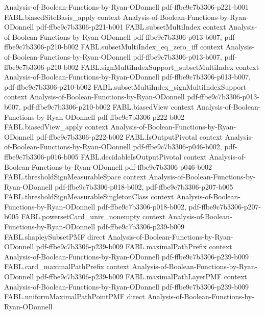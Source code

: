 \begin{theorem}
  {Analysis-of-Boolean-Functions-by-Ryan-ODonnell}
  {pdf-ffbe9c7b3306-p221-b001}
\proofstep
  {FABL.biasedSiteBasis_apply}
  {context}
  {Analysis-of-Boolean-Functions-by-Ryan-ODonnell}
  {pdf-ffbe9c7b3306-p221-b001}
\proofstep
  {FABL.subsetMultiIndex}
  {context}
  {Analysis-of-Boolean-Functions-by-Ryan-ODonnell}
  {pdf-ffbe9c7b3306-p013-b007,
    pdf-ffbe9c7b3306-p210-b002}
\proofstep
  {FABL.subsetMultiIndex_eq_zero_iff}
  {context}
  {Analysis-of-Boolean-Functions-by-Ryan-ODonnell}
  {pdf-ffbe9c7b3306-p013-b007,
    pdf-ffbe9c7b3306-p210-b002}
\proofstep
  {FABL.signMultiIndexSupport_subsetMultiIndex}
  {context}
  {Analysis-of-Boolean-Functions-by-Ryan-ODonnell}
  {pdf-ffbe9c7b3306-p013-b007,
    pdf-ffbe9c7b3306-p210-b002}
\proofstep
  {FABL.subsetMultiIndex_signMultiIndexSupport}
  {context}
  {Analysis-of-Boolean-Functions-by-Ryan-ODonnell}
  {pdf-ffbe9c7b3306-p013-b007,
    pdf-ffbe9c7b3306-p210-b002}
\proofstep
  {FABL.biasedView}
  {context}
  {Analysis-of-Boolean-Functions-by-Ryan-ODonnell}
  {pdf-ffbe9c7b3306-p222-b002}
\proofstep
  {FABL.biasedView_apply}
  {context}
  {Analysis-of-Boolean-Functions-by-Ryan-ODonnell}
  {pdf-ffbe9c7b3306-p222-b002}
\proofstep
  {FABL.IsOutputPivotal}
  {context}
  {Analysis-of-Boolean-Functions-by-Ryan-ODonnell}
  {pdf-ffbe9c7b3306-p046-b002,
    pdf-ffbe9c7b3306-p016-b005}
\proofstep
  {FABL.decidableIsOutputPivotal}
  {context}
  {Analysis-of-Boolean-Functions-by-Ryan-ODonnell}
  {pdf-ffbe9c7b3306-p046-b002}
\proofstep
  {FABL.thresholdSignMeasurableSpace}
  {context}
  {Analysis-of-Boolean-Functions-by-Ryan-ODonnell}
  {pdf-ffbe9c7b3306-p018-b002,
    pdf-ffbe9c7b3306-p207-b005}
\proofstep
  {FABL.thresholdSignMeasurableSingletonClass}
  {context}
  {Analysis-of-Boolean-Functions-by-Ryan-ODonnell}
  {pdf-ffbe9c7b3306-p018-b002,
    pdf-ffbe9c7b3306-p207-b005}
\proofstep
  {FABL.powersetCard_univ_nonempty}
  {context}
  {Analysis-of-Boolean-Functions-by-Ryan-ODonnell}
  {pdf-ffbe9c7b3306-p239-b009}
\proofstep
  {FABL.shapleySubsetPMF}
  {direct}
  {Analysis-of-Boolean-Functions-by-Ryan-ODonnell}
  {pdf-ffbe9c7b3306-p239-b009}
\proofstep
  {FABL.maximalPathPrefix}
  {context}
  {Analysis-of-Boolean-Functions-by-Ryan-ODonnell}
  {pdf-ffbe9c7b3306-p239-b009}
\proofstep
  {FABL.card_maximalPathPrefix}
  {context}
  {Analysis-of-Boolean-Functions-by-Ryan-ODonnell}
  {pdf-ffbe9c7b3306-p239-b009}
\proofstep
  {FABL.maximalPathLayerPMF}
  {context}
  {Analysis-of-Boolean-Functions-by-Ryan-ODonnell}
  {pdf-ffbe9c7b3306-p239-b009}
\proofstep
  {FABL.uniformMaximalPathPointPMF}
  {direct}
  {Analysis-of-Boolean-Functions-by-Ryan-ODonnell}

\end{theorem}
